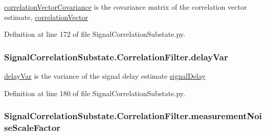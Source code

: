 \hyperlink{classSignalCorrelationSubstate_1_1CorrelationFilter_a484e6bdabe405d0aba1dcf4d5729dd72}{correlation\+Vector\+Covariance} is the covariance matrix of the correlation vector estimate, \hyperlink{classSignalCorrelationSubstate_1_1CorrelationFilter_ae308a025a3a7ebdf4e66b5fd3fdf2b7d}{correlation\+Vector} 



Definition at line 172 of file Signal\+Correlation\+Substate.\+py.

\subsubsection[{\texorpdfstring{delay\+Var}{delayVar}}]{\setlength{\rightskip}{0pt plus 5cm}Signal\+Correlation\+Substate.\+Correlation\+Filter.\+delay\+Var}\hypertarget{classSignalCorrelationSubstate_1_1CorrelationFilter_a34d52beb18c131f2305689d48f612a5a}{}\label{classSignalCorrelationSubstate_1_1CorrelationFilter_a34d52beb18c131f2305689d48f612a5a}


\hyperlink{classSignalCorrelationSubstate_1_1CorrelationFilter_a34d52beb18c131f2305689d48f612a5a}{delay\+Var} is the variance of the signal delay estimate \hyperlink{classSignalCorrelationSubstate_1_1CorrelationFilter_a01e35890dee1d79bd0e4f9e82cb16e3f}{signal\+Delay} 



Definition at line 180 of file Signal\+Correlation\+Substate.\+py.

\subsubsection[{\texorpdfstring{measurement\+Noise\+Scale\+Factor}{measurementNoiseScaleFactor}}]{\setlength{\rightskip}{0pt plus 5cm}Signal\+Correlation\+Substate.\+Correlation\+Filter.\+measurement\+Noise\+Scale\+Factor}\hypertarget{classSignalCorrelationSubstate_1_1CorrelationFilter_a21fc425a1d3bcb40b44afbca1f908de1}{}\label{classSignalCorrelationSubstate_1_1CorrelationFilter_a21fc425a1d3bcb40b44afbca1f908de1}


